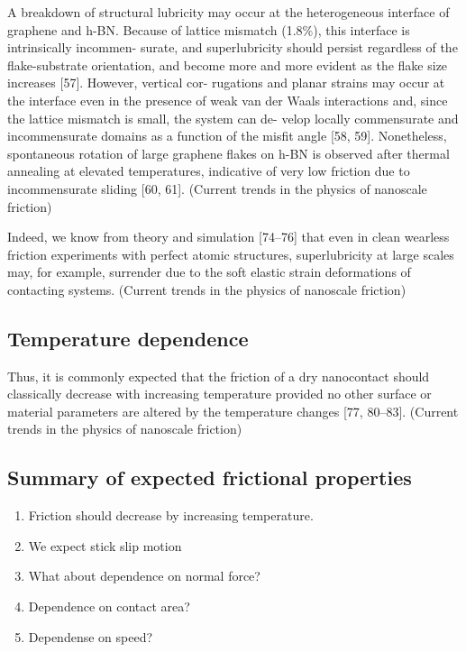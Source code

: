 A breakdown of structural lubricity may occur at the heterogeneous interface of graphene and h-BN. Because of lattice mismatch (1.8\%), this
interface is intrinsically incommen- surate, and superlubricity should persist regardless of the flake-substrate orientation, and become
more and more evident as the flake size increases [57]. However, vertical cor- rugations and planar strains may occur at the interface even
in the presence of weak van der Waals interactions and, since the lattice mismatch is small, the system can de- velop locally commensurate
and incommensurate domains as a function of the misfit angle [58, 59]. Nonetheless, spontaneous rotation of large graphene flakes on h-BN is
observed after thermal annealing at elevated temperatures, indicative of very low friction due to incommensurate sliding [60, 61]. (Current
trends in the physics of nanoscale friction)

Indeed, we know from theory and simulation [74–76] that even in clean wearless friction experiments with perfect atomic structures,
superlubricity at large scales may, for example, surrender due to the soft elastic strain deformations of contacting systems. (Current
trends in the physics of nanoscale friction)




\subsection{Temperature dependence}
Thus, it is commonly expected that the friction of a dry nanocontact should classically decrease with increasing temperature provided no
other surface or material parameters are altered by the temperature changes [77, 80–83]. (Current trends in the physics of nanoscale
friction)


\subsection{Summary of expected frictional properties}
\begin{enumerate}
  \item Friction should decrease by increasing temperature.
  \item We expect stick slip motion
  \item What about dependence on normal force?
  \item Dependence on contact area?
  \item Dependense on speed? 
\end{enumerate}

